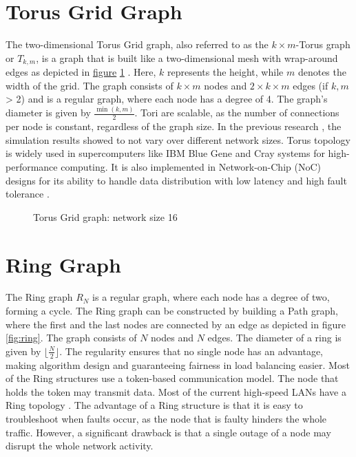 \section{Torus Grid Graph}\label{sec:2torusgridgraph}
The two-dimensional Torus Grid graph, also referred to as the $k \times m$-Torus graph or $T_{k,m}$, is a graph that is built like a two-dimensional mesh with wrap-around edges as depicted in \hyperref[fig:torusGraph]{figure} \ref{fig:torusGraph} \cite{Mahlmann2010}. Here, $k$ represents the height, while $m$ denotes the width of the grid. The graph consists of $k \times m$ nodes and $2\times k \times m$ edges (if $k, m$ > 2) and is a regular graph, where each node has a degree of 4. The graph's diameter is given by $\frac{\min(k,m)}{2}$. Tori are scalable, as the number of connections per node is constant, regardless of the graph size. In the previous research \cite{Bayazitoglu}, the simulation results showed to not vary over different network sizes. Torus topology is widely used in supercomputers like IBM Blue Gene and Cray systems for high-performance computing. It is also implemented in Network-on-Chip (NoC) designs for its ability to handle data distribution with low latency and high fault tolerance \cite{Banerjee2001}.

\begin{figure}[H]
    \centering
    \scalebox{1.5}{}
    \caption{Torus Grid graph: network size 16}
    \label{fig:torusGraph}
\end{figure}

\section{Ring Graph}\label{sec:2ringgraph}
The Ring graph $R_N$ is a regular graph, where each node has a degree of two, forming a cycle. The Ring graph can be constructed by building a Path graph, where the first and the last nodes are connected by an edge as depicted in figure \ref{fig:ring}. The graph consists of $N$ nodes and $N$ edges. The diameter of a ring is given by $\lfloor{\frac{N}{2}}\rfloor$. The regularity ensures that no single node has an advantage, making algorithm design and guaranteeing fairness in load balancing easier. Most of the Ring structures use a token-based communication model. The node that holds the token may transmit data. Most of the current high-speed LANs have a Ring topology \cite{Vidomenko1997}. The advantage of a Ring structure is that it is easy to troubleshoot when faults occur, as the node that is faulty hinders the whole traffic. However, a significant drawback is that a single outage of a node may disrupt the whole network activity.

